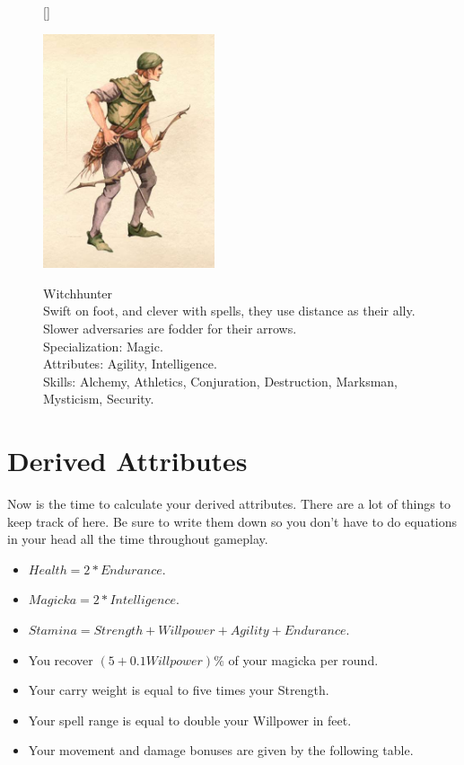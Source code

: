 \documentclass[12pt]{book}
\begin{document}
\begin{figure}[H]
[\FBwidth]
{\caption*{Witchhunter\\

Swift on foot, and clever with spells, they use distance as their ally. Slower adversaries are fodder for their arrows.\\

Specialization: Magic.\\

Attributes: Agility, Intelligence.\\

Skills: Alchemy, Athletics, Conjuration, Destruction, Marksman, Mysticism, Security.}\label{fig:test}}
{\includegraphics[width=0.45\textwidth]{Witchhunter.png}}
\end{figure}

\newpage
\section{Derived Attributes}
Now is the time to calculate your derived attributes. There are a lot of things to keep track of here. Be sure to write them down so you don't have to do equations in your head all the time throughout gameplay.
\begin{itemize}
	\item $Health=2*Endurance$.
	\item $Magicka=2*Intelligence$.
	\item $Stamina=Strength+Willpower+Agility+Endurance$.
	\item You recover $(5+0.1Willpower)\%$ of your magicka per round.
	\item Your carry weight is equal to five times your Strength.
	\item Your spell range is equal to double your Willpower in feet. 
	\item Your movement and damage bonuses are given by the following table.
\end{itemize}
\end{document}
